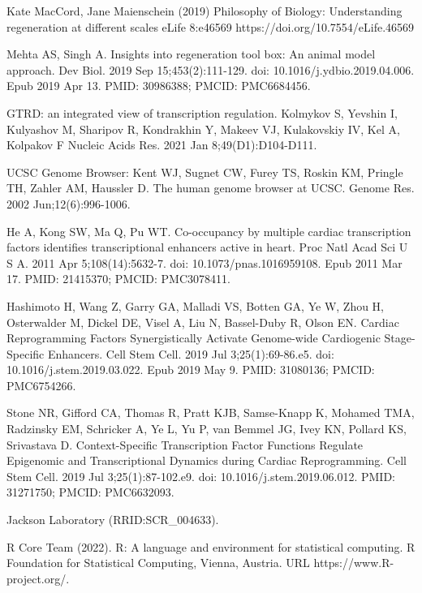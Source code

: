 \documentclass[12pt]{article}
\begin{document}

\begin{thebibliography}{99}

 Kate MacCord, Jane Maienschein (2019) Philosophy of
Biology: Understanding regeneration at different scales eLife 8:e46569
https://doi.org/10.7554/eLife.46569

 Mehta AS, Singh A. Insights into regeneration tool box:
An animal model approach. Dev Biol. 2019 Sep 15;453(2):111-129.
doi: 10.1016/j.ydbio.2019.04.006. Epub 2019 Apr 13. PMID: 30986388;
PMCID: PMC6684456.

 GTRD: an integrated view of transcription regulation.
Kolmykov S, Yevshin I, Kulyashov M, Sharipov R, Kondrakhin Y, Makeev VJ,
Kulakovskiy IV, Kel A, Kolpakov F Nucleic Acids Res. 2021 Jan 8;49(D1):D104-D111.

 UCSC Genome Browser: Kent WJ, Sugnet CW, Furey TS, Roskin KM,
Pringle TH, Zahler AM, Haussler D. The human genome browser at UCSC. Genome Res.
2002 Jun;12(6):996-1006.

 He A, Kong SW, Ma Q, Pu WT. Co-occupancy by multiple cardiac
transcription factors identifies transcriptional enhancers active in heart.
Proc Natl Acad Sci U S A. 2011 Apr 5;108(14):5632-7. doi: 10.1073/pnas.1016959108.
Epub 2011 Mar 17. PMID: 21415370; PMCID: PMC3078411.

 Hashimoto H, Wang Z, Garry GA, Malladi VS, Botten GA, Ye W,
Zhou H, Osterwalder M, Dickel DE, Visel A, Liu N, Bassel-Duby R, Olson EN.
Cardiac Reprogramming Factors Synergistically Activate Genome-wide Cardiogenic
Stage-Specific Enhancers. Cell Stem Cell. 2019 Jul 3;25(1):69-86.e5.
doi: 10.1016/j.stem.2019.03.022. Epub 2019 May 9. PMID: 31080136;
PMCID: PMC6754266.

 Stone NR, Gifford CA, Thomas R, Pratt KJB, Samse-Knapp K,
Mohamed TMA, Radzinsky EM, Schricker A, Ye L, Yu P, van Bemmel JG, Ivey KN,
Pollard KS, Srivastava D. Context-Specific Transcription Factor Functions
Regulate Epigenomic and Transcriptional Dynamics during Cardiac Reprogramming.
Cell Stem Cell. 2019 Jul 3;25(1):87-102.e9. doi: 10.1016/j.stem.2019.06.012.
PMID: 31271750; PMCID: PMC6632093.

 Jackson Laboratory (RRID:SCR\_004633).

 R Core Team (2022).
R: A language and environment for statistical computing. R Foundation
for Statistical Computing, Vienna, Austria. URL https://www.R-project.org/.


\end{thebibliography}
\end{document}
